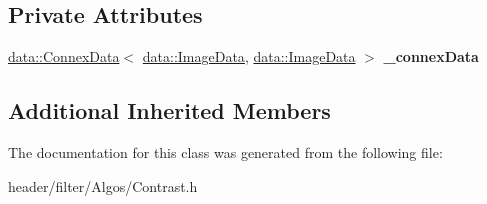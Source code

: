 \subsection*{Private Attributes}
\begin{DoxyCompactItemize}
\item 
\mbox{\label{classfilter_1_1algos_1_1_contrast_afe0214066718eb141d3b7e6417a3f7ca}} 
\hyperlink{classfilter_1_1data_1_1_connex_data}{data\+::\+Connex\+Data}$<$ \hyperlink{classfilter_1_1data_1_1_image_data}{data\+::\+Image\+Data}, \hyperlink{classfilter_1_1data_1_1_image_data}{data\+::\+Image\+Data} $>$ {\bfseries \+\_\+connex\+Data}
\end{DoxyCompactItemize}
\subsection*{Additional Inherited Members}


The documentation for this class was generated from the following file\+:\begin{DoxyCompactItemize}
\item 
header/filter/\+Algos/Contrast.\+h\end{DoxyCompactItemize}
